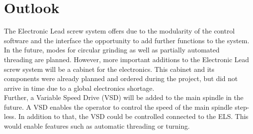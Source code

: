\chapter{Outlook}
\label{outlook}
The Electronic Lead screw system offers due to the modularity of the control software and the interface the opportunity to add further functions to the system. In the future, modes for circular grinding as well as partially automated threading are planned. However, more important additions to the Electronic Lead screw system will be a cabinet for the electronics. This cabinet and its components were already planned and ordered during the project, but did not arrive in time due to a global electronics shortage.\\
Further, a Variable Speed Drive (VSD) will be added to the main spindle in the future. A VSD enables the operator to control the speed of the main spindle step-less. In addition to that, the VSD could be controlled connected to the ELS. This would enable features such as automatic threading or turning.

